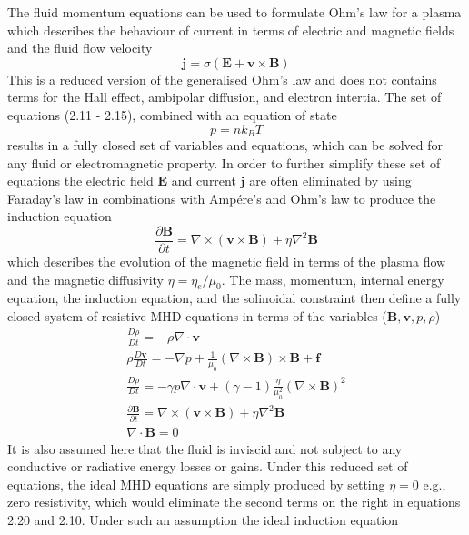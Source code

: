 The fluid momentum equations can be used to formulate Ohm's law for a plasma which describes the behaviour of current in terms of electric and magnetic fields and the fluid flow velocity
\begin{equation}
\mathbf{j} = \sigma(\mathbf{E} + \mathbf{v}\times \mathbf{B})
\end{equation}
This is a reduced version of the generalised Ohm's law and does not contains terms for the Hall effect, ambipolar diffusion, and electron intertia. The set of equations (2.11 - 2.15), combined with an equation of state 
\begin{equation}
p = nk_BT
\end{equation}
results in a fully closed set of variables and equations, which can be solved for any fluid or electromagnetic property. In order to further simplify these set of equations the electric field $\mathbf{E}$ and current $\mathbf{j}$ are often eliminated by using Faraday's law in combinations with Amp\'{e}re's and Ohm's law to produce the induction equation
\begin{equation}
\frac{\partial \mathbf{B}}{\partial t} = \nabla \times(\mathbf{v}\times \mathbf{B}) + \eta\nabla^2 \mathbf{B}
\end{equation}
which describes the evolution of the magnetic field in terms of the plasma flow and the magnetic diffusivity $\eta = \eta_e/\mu_0$.  The mass, momentum, internal energy equation, the induction equation, and the solinoidal constraint then define  a fully closed system of resistive MHD equations in terms of the variables ($\mathbf{B}, \mathbf{v}, p, \rho$)
\begin{eqnarray}
\frac{D\rho}{Dt} = -\rho\nabla\cdot \mathbf{v} \\
\rho\frac{D\mathbf{v}}{Dt}=-\nabla p + \frac{1}{\mu_0}(\nabla \times \mathbf{B})\times \mathbf{B} + \mathbf{f} \\
\frac{D\rho}{Dt} = -\gamma p\nabla\cdot \mathbf{v} +(\gamma -1)\frac{\eta}{\mu_0^2} (\nabla \times \mathbf{B})^2 \\
\frac{\partial \mathbf{B}}{\partial t} = \nabla \times(\mathbf{v}\times \mathbf{B}) + \eta\nabla^2 \mathbf{B} \\
\nabla\cdot \mathbf{B} = 0
\end{eqnarray}
It is also assumed here that the fluid is inviscid and not subject to any conductive or radiative energy losses or gains. Under this reduced set of equations, the ideal MHD equations are simply produced by setting $\eta = 0$ e.g., zero resistivity, which would eliminate the second terms on the right in equations 2.20 and 2.10. Under such an assumption the ideal induction equation
